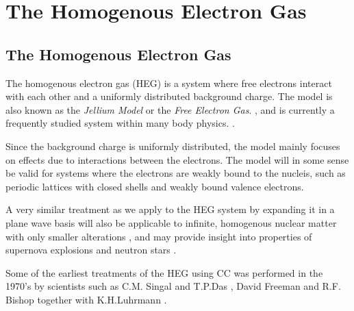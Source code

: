 
\chapter{The Homogenous Electron Gas} %

\label{Chapter6} %



\section{The Homogenous Electron Gas}

The homogenous electron gas (HEG) is a system where free electrons interact with each other and a uniformly distributed background charge.  \cite{GrossRungeHeinonen} The model is also known as the \emph{Jellium Model} or the \emph{Free Electron Gas}. \cite{GrossRungeHeinonen}, and is currently a frequently studied system within many body physics. \cite{Shepherd2014, Baardsen2014, Roggero2013, Shepherd2012}. 

Since the background charge is uniformly distributed, the model mainly focuses on effects due to interactions between the electrons. The model will in some sense be valid for systems where the electrons are weakly bound to the nucleis, such as periodic lattices with closed shells and weakly bound valence electrons. \cite{GrossRungeHeinonen}

A very similar treatment as we apply to the HEG system by expanding it in a plane wave basis will also be applicable to infinite, homogenous nuclear matter with only smaller alterations \cite{Baardsen2014}, and may provide insight into properties of supernova explosions \cite{burrows2013} and neutron stars \cite{weber1999,hh2000}. 

Some of the earliest treatments of the HEG using CC was performed in the 1970's by scientists such as C.M. Singal and T.P.Das \cite{Singal1973},  David Freeman  \cite{Freeman1977} and  R.F. Bishop together with K.H.Luhrmann  \cite{Bishop1978} \cite{Bishop1982}. 



